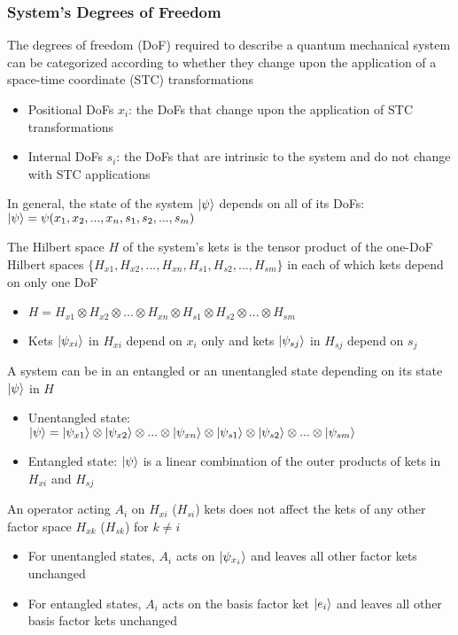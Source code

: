 \documentclass[8pt,t,mathserif,aspectratio=169]{beamer}
\begin{document}
\begin{frame}
  \frametitle{System's Degrees of Freedom}
  \vspace{1mm}
  The degrees of freedom (DoF) required to describe a quantum mechanical system can be categorized according to whether they change upon the application of a space-time coordinate (STC) transformations
  \begin{itemize}
    \item Positional DoFs $x_i$: the DoFs that change upon the application of STC transformations
    \item Internal DoFs $s_i$: the DoFs that are intrinsic to the system and do not change with STC applications 
  \end{itemize}
  In general, the state of the system $\ket{\psi}$ depends on all of its DoFs: $\ket{\psi} = \psi(x_1,x_2,...,x_n,s_1,s_2,...,s_m)$

  The Hilbert space $H$ of the system's kets is the tensor product of the one-DoF Hilbert spaces $\{H_{x1},H_{x2},...,H_{xn},H_{s1},H_{s2},...,H_{sm}\}$ in each of which kets depend on only one DoF
  \begin{itemize}
    \item $H = H_{x1} \otimes H_{x2} \otimes ... \otimes H_{xn} \otimes H_{s1} \otimes H_{s2} \otimes ... \otimes H_{sm}$
    \item Kets $\ket{\psi_{xi}}$ in $H_{xi}$ depend on $x_i$ only and kets $\ket{\psi_{sj}}$ in $H_{sj}$ depend on $s_j$
    \end{itemize}
    A system can be in an entangled or an unentangled state depending on its state $\ket{\psi}$ in $H$
    \begin{itemize}
    \item Unentangled state: $\ket{\psi} = \ket{\psi_{x1}} \otimes \ket{\psi_{x2}} \otimes ... \otimes \ket{\psi_{xn}} \otimes \ket{\psi_{s1}} \otimes \ket{\psi_{s2}} \otimes ... \otimes \ket{\psi_{sm}}$
    \item Entangled state: $\ket{\psi}$ is a linear combination of the outer products of kets in $H_{xi}$ and $H_{sj}$
  \end{itemize}
  An operator acting $A_i$ on $H_{xi}$ ($H_{si}$) kets does not affect the kets of any other factor space $H_{xk}$ ($H_{sk}$) for $k \neq i$
  \begin{itemize}
    \item For unentangled states, $A_i$ acts on $\ket{\psi_{x_i}}$ and leaves all other factor kets unchanged
    \item For entangled states, $A_i$ acts on the basis factor ket $\ket{e_i}$ and leaves all other basis factor kets unchanged
  \end{itemize}
\end{frame}
\end{document}
